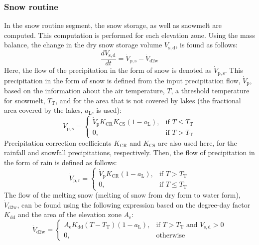 \documentclass[%
]{USN-PhD}
\begin{document}
\subsubsection{Snow routine}

In the snow routine segment, the snow storage, as well as snowmelt are computed. This computation is performed for each elevation zone. Using the mass balance, the change in the dry snow storage volume $V_\mathrm{s,d}$, is found as follows:
\begin{equation}\label{eq:eq20}
\frac{dV_\mathrm{s,d}}{dt}=\dot{V}_\mathrm{p,s}-\dot{V}_\mathrm{d2w}
\end{equation}
Here, the flow of the precipitation in the form of snow is denoted as $\dot{V}_\mathrm{p,s}$. This precipitation in the form of snow is defined from the input precipitation flow, $\dot{V}_\mathrm{p}$, based on the information about the air temperature, $T$, a threshold temperature for snowmelt, $T_\mathrm{T}$, and for the area that is not covered by lakes (the fractional area covered by the lakes, $a_\mathrm{L}$, is used):
\begin{equation}\label{eq:eq21}
\dot{V}_\mathrm{p,s}=\begin{cases} \dot{V}_\mathrm{p}K_\mathrm{CR}K_\mathrm{CS}(1 - a_\mathrm{L}), & \mbox{if } T\leq T_\mathrm{T}\\ 0, & \mbox{if } T>T_\mathrm{T} \end{cases}
\end{equation}
Precipitation correction coefficients $K_\mathrm{CR}$ and $K_\mathrm{CS}$ are also used here, for the rainfall and snowfall precipitations, respectively. Then, the flow of precipitation in the form of rain is defined as follows:
\begin{equation}\label{eq:eq22}
\dot{V}_\mathrm{p,r}=\begin{cases} \dot{V}_\mathrm{p}K_\mathrm{CR}(1 - a_\mathrm{L}), & \mbox{if } T>T_\mathrm{T}\\ 0, & \mbox{if } T\leq T_\mathrm{T} \end{cases}
\end{equation}
The flow of the melting snow (melting of snow from dry form to water form), $\dot{V}_\mathrm{d2w}$, can be found using the following expression based on the degree-day factor $K_\mathrm{dd}$ and the area of the elevation zone $A_\mathrm{e}$:
\begin{equation}\label{eq:eq23}
\dot{V}_\mathrm{d2w}=\begin{cases} A_\mathrm{e}K_\mathrm{dd}(T - T_\mathrm{T})(1 - a_\mathrm{L}), & \mbox{if }T>T_\mathrm{T}\mbox{ and }V_\mathrm{s,d}>0\\ 0, & \mbox{otherwise} \end{cases}
\end{equation}
\end{document}
